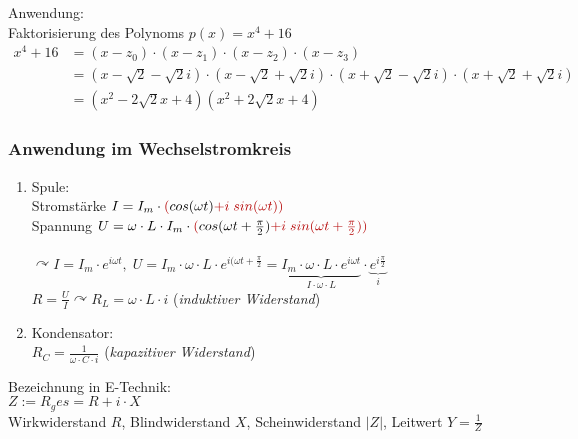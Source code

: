 Anwendung: \\
Faktorisierung des Polynoms $p(x)=x^4+16$
\begin{align*}
x^4+16 &= (x-z_0)\cdot(x-z_1)\cdot(x-z_2)\cdot(x-z_3)\\
&= (x-\sqrt{2}-\sqrt{2}i)\cdot (x-\sqrt{2}+\sqrt{2}i)\cdot (x+\sqrt{2}-\sqrt{2}i) \cdot (x+\sqrt{2}+\sqrt{2}i)\\
&= (x^2-2\sqrt{2}x+4)(x^2+2\sqrt{2}x+4)
\end{align*}

\subsubsection{Anwendung im Wechselstromkreis}
\begin{enumerate}
\item Spule: \\
Stromstärke $I=I_m\cdot \tred{(}cos (\omega t) \tred{+ i \; sin(\omega t))}$\\
Spannung $U=\omega \cdot L\cdot I_m \cdot \tred{(}cos (\omega t +\frac{\pi}{2}) \tred{+ i \; sin(\omega t  +\frac{\pi}{2}))}$\\
\\
$\curvearrowright I=I_m \cdot e^{i\omega t}, \; U=I_m\cdot \omega \cdot L \cdot e^{i(\omega t+\frac{\pi}{2}}=\underbrace{I_m\cdot \omega \cdot L \cdot e^{i\omega t}}_{I\cdot \omega \cdot L}\cdot \underbrace{e^{i\frac{\pi}{2}}}_i$\\
$R=\frac{U}{I}\curvearrowright \boxed{R_L=\omega \cdot L \cdot i}$ (\emph{induktiver Widerstand})
\item Kondensator: \\
$\boxed{R_C=\frac{1}{\omega \cdot C \cdot i}}$ (\emph{kapazitiver Widerstand})
\end{enumerate}
Bezeichnung in E-Technik:\\
$Z:= R_ges = R+i\cdot X$\\
Wirkwiderstand $R$, Blindwiderstand $X$, Scheinwiderstand $|Z|$, Leitwert $Y=\frac{1}{Z}$

